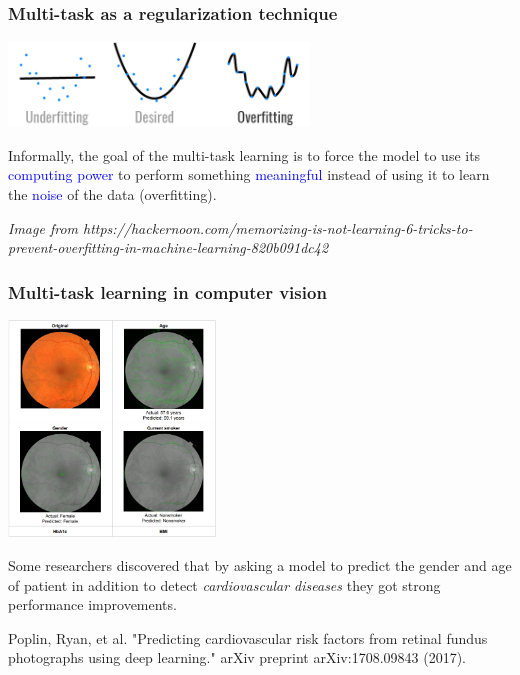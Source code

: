 \documentclass[10pt]{beamer}
\begin{document}
\begin{frame}
  \frametitle{Multi-task as a regularization technique}

  \begin{center}
    \includegraphics[width = 8cm]{images/overfitting.png}
  \end{center}

  Informally, the goal of the multi-task learning is to force the
  model to use its \textcolor{blue}{computing power} to perform
  something \textcolor{blue}{meaningful} instead of using it to learn
  the \textcolor{blue}{noise} of the data (overfitting).

  \bigskip

  {\scriptsize \textit{Image from
      https://hackernoon.com/memorizing-is-not-learning-6-tricks-to-prevent-overfitting-in-machine-learning-820b091dc42}}
\end{frame}

\begin{frame}
  \frametitle{Multi-task learning in computer vision}

  \begin{center}
    \includegraphics[width = 5.5cm]{images/multi_task_medecine.png}
  \end{center}

  \medskip

  Some researchers discovered that by asking a model to predict the
  gender and age of patient in addition to detect \emph{cardiovascular
    diseases} they got strong performance improvements.

  \medskip

  {\scriptsize Poplin, Ryan, et al. "Predicting cardiovascular risk
    factors from retinal fundus photographs using deep learning."
    arXiv preprint arXiv:1708.09843 (2017).}
\end{frame}
\end{document}
